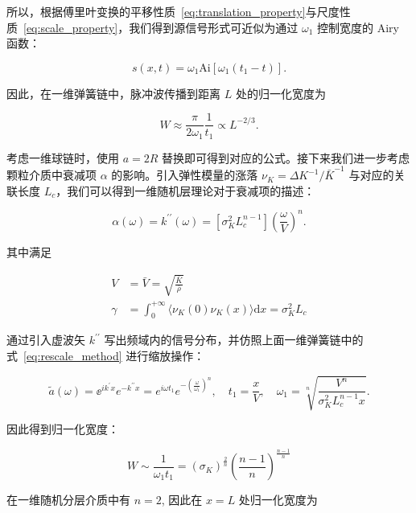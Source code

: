 所以，根据傅里叶变换的平移性质~\eqref{eq:translation_property}与尺度性质~\eqref{eq:scale_property}，我们得到源信号形式可近似为通过 $\omega_{1}$ 控制宽度的 Airy 函数：

\begin{equation}
  s(x,t) = \omega_{1}\text{Ai}\left[\omega_{1}(t_{1}-t)\right].
\end{equation}

因此，在一维弹簧链中，脉冲波传播到距离 $L$ 处的归一化宽度为

\begin{equation}
  W \approx \frac{\pi}{2\omega_{1}}\frac{1}{t_{1}}\propto L^{-2/3}.
\end{equation}

考虑一维球链时，使用 $a=2R$ 替换即可得到对应的公式\cite{PhysRevE.91.022205}。接下来我们进一步考虑颗粒介质中衰减项 $\alpha$ 的影响。引入弹性模量的涨落 $\nu_{K} = \Delta K^{-1}/\bar{K}^{-1}$ 与对应的关联长度 $L_{c}$，我们可以得到一维随机层理论对于衰减项的描述：

\begin{equation}
  \alpha(\omega) = k^{\prime\prime}(\omega) = [\sigma_{K}^{2}L_{c}^{n-1}]\left(\frac{\omega}{V}\right)^{n}.
\end{equation}

其中满足

\begin{align}
  V &= \bar{V} = \sqrt{\frac{\bar{K}}{\bar{\rho}}}\\
  \gamma &= \int_{0}^{+\infty}\langle\nu_{K}(0)\nu_{K}(x)\rangle\mathrm{d}x = \sigma_{K}^{2}L_{c}
\end{align}

通过引入虚波矢 $k^{\prime\prime}$ 写出频域内的信号分布，并仿照上面一维弹簧链中的式~\eqref{eq:rescale_method} 进行缩放操作：

\begin{equation}
  \widetilde{a}(\omega) = {\ee}^{ik^{\prime}x}e^{-k^{\prime\prime}x} = e^{i\omega t_{1}}e^{-\left(\frac{\omega}{\omega_{1}}\right)^{n}},\quad t_{1} = \frac{x}{V},\quad \omega_{1} = \sqrt[n]{\frac{V^{n}}{\sigma_{K}^{2}L_{c}^{n-1}x}}.
\end{equation}

因此得到归一化宽度：

\begin{equation}
W\sim \frac{1}{\omega_{1}t_{1}} = (\sigma_{K})^{\frac{2}{n}}\left(\frac{n-1}{n}\right)^{\frac{n-1}{n}}
\end{equation}

在一维随机分层介质中有 $n=2$, 因此在 $x = L$ 处归一化宽度为

